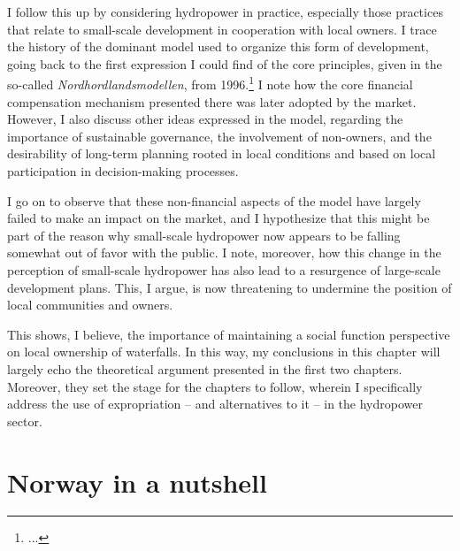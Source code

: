 I follow this up by considering hydropower in practice, especially those practices that relate to small-scale development in cooperation with local owners. I trace the history of the dominant model used to organize this form of development, going back to the first expression I could find of the core principles, given in the so-called {\it Nordhordlandsmodellen}, from 1996.\footnote{...} I note how the core financial compensation mechanism presented there was later adopted by the market. However, I also discuss other ideas expressed in the model, regarding the importance of sustainable governance, the involvement of non-owners, and the desirability of long-term planning rooted in local conditions and based on local participation in decision-making processes.

I go on to observe that these non-financial aspects of the model have largely failed to make an impact on the market, and I hypothesize that this might be part of the reason why small-scale hydropower now appears to be falling somewhat out of favor with the public. I note, moreover, how this change in the perception of small-scale hydropower has also lead to a resurgence of large-scale development plans. This, I argue, is now threatening to undermine the position of local communities and owners.

This shows, I believe, the importance of maintaining a social function perspective on local ownership of waterfalls. In this way, my conclusions in this chapter will largely echo the theoretical argument presented in the first two chapters. Moreover, they set the stage for the chapters to follow, wherein I specifically address the use of expropriation -- and alternatives to it --  in the hydropower sector.

\section{Norway in a nutshell}\label{sec:nutshell}

